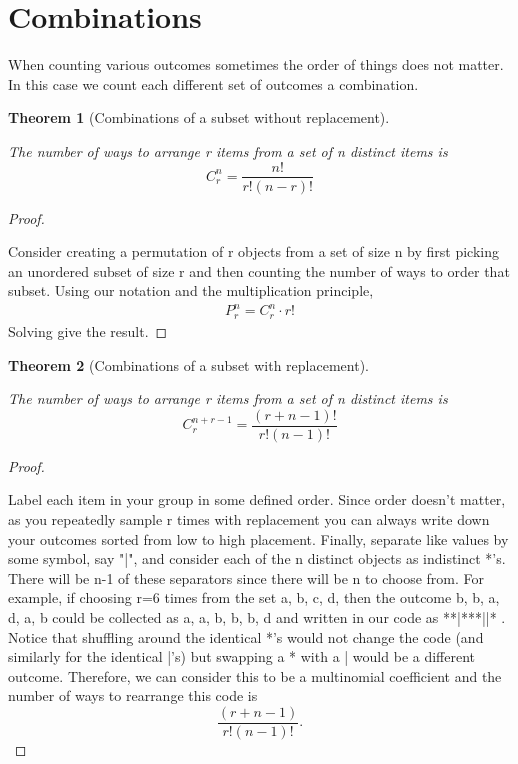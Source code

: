 \documentclass[10pt,]{book}
\theoremstyle{plain}
\newtheorem{theorem}{Theorem}[section]
\theoremstyle{definition}
\theoremstyle{definition}
\theoremstyle{definition}
\numberwithin{equation}{section}
\begin{document}
\section[{Combinations}]{Combinations}\label{section-15}
When counting various outcomes sometimes the order of things does not matter.
In this case we count each different set of outcomes a combination. %
\begin{theorem}[{Combinations of a subset without replacement}]\label{theorem-8}

			The number of ways to arrange r items from a set of n distinct items 
			is 
			\begin{equation*} C_r^n = \frac{n!}{r!(n-r)!} \end{equation*}
\end{theorem}
\begin{proof}\hypertarget{proof-7}{}

			Consider creating a permutation of r objects from a set of size n
			by first picking an unordered subset of size r and then counting 
			the number of ways to order that subset. Using our notation and the
			multiplication principle,
			\begin{gather*}
P_r^n = C_r^n \cdot r!
\end{gather*}
			Solving give the result.
\end{proof}
\begin{theorem}[{Combinations of a subset with replacement}]\label{theorem-9}

			The number of ways to arrange r items from a set of n distinct items 
			is 
			\begin{equation*} C_r^{n+r-1} = \frac{(r+n-1)!}{r!(n-1)!} \end{equation*}
\end{theorem}
\begin{proof}\hypertarget{proof-8}{}

			Label each item in your group in some defined order. Since order doesn't matter, as you repeatedly sample r times with replacement you can always write down your outcomes sorted from low to high placement. Finally, separate like values by some symbol, say "|", and consider each of the n distinct objects as indistinct *'s. There will be n-1 of these separators since there will be n to choose from. For example, if choosing r=6 times from the set {a, b, c, d}, then the outcome b, b, a, d, a, b could be collected as a, a, b, b, b, d and written in our code as **|***||* .  Notice that shuffling around the identical *'s would not change the code (and similarly for the identical |'s) but swapping a * with a | would be a different outcome. Therefore, we can consider this to be a multinomial coefficient and the number of ways to rearrange this code is
			\begin{equation*}\frac{(r + n-1)}{r!(n-1)!}.\end{equation*}
\end{proof}
\end{document}
